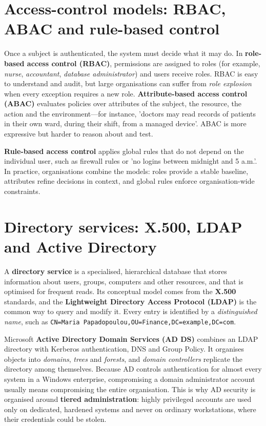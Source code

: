 \section{Access-control models: RBAC, ABAC and rule-based control}\label{sec:8.3}
Once a subject is authenticated, the system must decide what it may do. In \textbf{role-based access control (RBAC)}, permissions are assigned to roles (for example, \emph{nurse}, \emph{accountant}, \emph{database administrator}) and users receive roles. RBAC is easy to understand and audit, but large organisations can suffer from \emph{role explosion} when every exception requires a new role. \textbf{Attribute-based access control (ABAC)} evaluates policies over attributes of the subject, the resource, the action and the environment—for instance, 'doctors may read records of patients in their own ward, during their shift, from a managed device'. ABAC is more expressive but harder to reason about and test.

\textbf{Rule-based access control} applies global rules that do not depend on the individual user, such as firewall rules or 'no logins between midnight and 5 a.m.'. In practice, organisations combine the models: roles provide a stable baseline, attributes refine decisions in context, and global rules enforce organisation-wide constraints.

\section{Directory services: X.500, LDAP and Active Directory}\label{sec:8.4}
A \textbf{directory service} is a specialised, hierarchical database that stores information about users, groups, computers and other resources, and that is optimised for frequent reads. Its conceptual model comes from the \textbf{X.500} standards, and the \textbf{Lightweight Directory Access Protocol (LDAP)} is the common way to query and modify it. Every entry is identified by a \emph{distinguished name}, such as \texttt{CN=Maria Papadopoulou,OU=Finance,DC=example,DC=com}.

Microsoft \textbf{Active Directory Domain Services (AD DS)} combines an LDAP directory with Kerberos authentication, DNS and Group Policy. It organises objects into \emph{domains}, \emph{trees} and \emph{forests}, and \emph{domain controllers} replicate the directory among themselves. Because AD controls authentication for almost every system in a Windows enterprise, compromising a domain administrator account usually means compromising the entire organisation. This is why AD security is organised around \textbf{tiered administration}: highly privileged accounts are used only on dedicated, hardened systems and never on ordinary workstations, where their credentials could be stolen.

